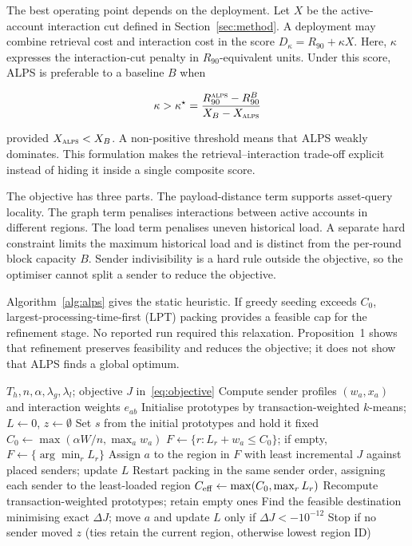 \documentclass[conference,letterpaper]{IEEEtran}
\begin{document}
The best operating point depends on the deployment. Let $X$ be the
active-account interaction cut defined in Section~\ref{sec:method}. A
deployment may combine retrieval cost and interaction cost in the score
$D_\kappa=R_{90}+\kappa X$. Here, $\kappa$ expresses the interaction-cut
penalty in $R_{90}$-equivalent units. Under this score, ALPS is preferable to a
baseline $B$ when

\begin{equation}
\label{eq:deployment}
\kappa > \kappa^\star=
\frac{R_{90}^{\textsc{alps}}-R_{90}^{B}}{X_B-X_{\textsc{alps}}}
\end{equation}

provided $X_{\textsc{alps}}<X_B$. A non-positive threshold means that ALPS
weakly dominates. This formulation makes the retrieval--interaction trade-off
explicit instead of hiding it inside a single composite score.

The objective has three parts. The payload-distance term supports
asset-query locality. The graph term penalises interactions between active
accounts in different regions. The load term penalises uneven historical load.
A separate hard constraint limits the maximum historical load and is distinct
from the per-round block capacity $B$. Sender indivisibility is a hard rule
outside the objective, so the optimiser cannot split a sender to reduce the
objective.

Algorithm~\ref{alg:alps} gives the static heuristic. If greedy seeding exceeds
$C_0$, largest-processing-time-first (LPT) packing provides a feasible cap for
the refinement stage. No reported run required this relaxation. Proposition~1
shows that refinement preserves feasibility and reduces the objective; it
does not show that ALPS finds a global optimum.

\begin{algorithm}[t]
\caption{Static ALPS: all assignments and moves keep senders whole.}
\label{alg:alps}
\small
\begin{algorithmic}[1]
\REQUIRE $T_h,n,\alpha,\lambda_g,\lambda_l$; objective $J$ in~\eqref{eq:objective}
\STATE Compute sender profiles $(w_a,x_a)$ and interaction weights $e_{ab}$
\STATE Initialise prototypes by transaction-weighted $k$-means;
 $L\leftarrow0$, $z\leftarrow\emptyset$
\STATE Set $s$ from the initial prototypes and hold it fixed
\STATE $C_0\leftarrow\max(\alpha W/n,\max_a w_a)$
\STATE $F\leftarrow\{r:L_r+w_a\leq C_0\}$; if empty,
 $F\leftarrow\{\arg\min_r L_r\}$
\STATE Assign $a$ to the region in $F$ with least incremental $J$
 against placed senders; update $L$
\ENDFOR
{}
\STATE Restart packing in the same sender order, assigning each sender to
 the least-loaded region
\ENDIF
\STATE $C_{\rm eff}\leftarrow\max(C_0,\max_r L_r)$
\STATE Recompute transaction-weighted prototypes; retain empty ones
\STATE Find the feasible destination minimising exact $\Delta J$;
 move $a$ and update $L$ only if $\Delta J<-10^{-12}$
\ENDFOR
\STATE Stop if no sender moved
\ENDFOR
\RETURN $z$ (ties retain the current region, otherwise lowest region ID)
\end{algorithmic}
\end{algorithm}
\end{document}
